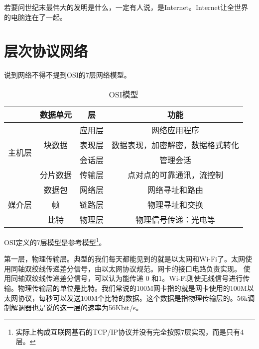 

若要问世纪末最伟大的发明是什么，一定有人说，是Internet。Internet让全世界的电脑连在了一起。

\section{层次协议网络}

说到网络不得不提到OSI的7层网络模型。

\begin{table}[h]
\begin{center}
\caption{OSI模型}\label{tabel:ISOmodule}
\begin{tabular}{|c|c|c|c|}
\hline
& 数据单元 & 层 & 功能  \\ \hline %
\multirow{4}{*}{主机层}   &  \multirow{3}{*}{块数据} & 应用层  &  网络应用程序  \\ \cline{3-4}
&						 & 表现层 & 数据表现，加密解密，数据格式转化  \\ \cline{3-4}
&						 & 会话层 & 管理会话 \\ \cline{2-4}
& 分片数据  & 传输层 & 点对点的可靠通讯，流控制 \\ \hline
\multirow{3}{*}{媒介层}  & 数据包   & 网络层 & 网络寻址和路由 \\ \cline{2-4}
& 帧 & 链路层 & 物理寻址和交换 \\ \cline{2-4}
& 比特 & 物理层 & 物理信号传递：光电等 \\\hline
\end{tabular}
\end{center}
\end{table}

OSI定义的7层模型是参考模型\footnote{实际上构成互联网基石的TCP/IP协议并没有完全按照7层实现，而是只有4层。}。

第一层，物理传输层。典型的我们每天都能见到的就是以太网和Wi-Fi了。太网使用同轴双绞线传递差分信号，由以太网协议规范。网卡的接口电路负责实现。
使用同轴双绞线传递差分信号，可以认为能传递 0 和1。Wi-Fi则使无线信号进行传输。物理传输层的单位是比特。我们常说的100M网卡指的就是网卡使用的100M以太网协议，每秒可以发送100M个比特的数据。这个数据是指物理传输层的。56k调制解调器也是说的这一层的速率为56Kbit/s。

